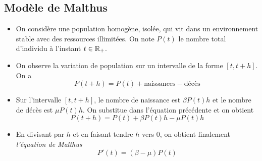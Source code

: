 
\subsection{Modèle de Malthus}
\begin{frame}
    \begin{itemize}
        \item On considère une population homogène, isolée, qui vit dans un environnement stable avec des ressources illimitées. On note $P(t)$ le nombre total d'individu à l'instant $t \in \mathbb{R}_+$. \pause
        \item On observe la variation de population sur un intervalle de la forme $[t,t+h]$. On a 
        \begin{equation*}
            P(t+h) = P(t) + \text{naissances} - \text{décès}
        \end{equation*} \pause
        \item Sur l'intervalle $[t,t+h]$, le nombre de naissance est $\beta P(t)h$ et le nombre de décès est $\mu P(t) h$. On substitue dans l'équation précédente et on obtient
        \begin{equation*}
            P(t+h)=P(t)+\beta P(t)h - \mu P(t)h
        \end{equation*} \pause
        \item En divisant par $h$ et en faisant tendre $h$ vers $0$, on obtient finalement \textcolor{astral}{\textit{l'équation de Malthus}}
        \begin{equation*}
            P'(t) = (\beta - \mu)P(t)
        \end{equation*} %
    \end{itemize}
\end{frame}

